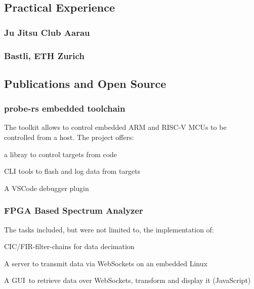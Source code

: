 \begin{timeline}
    \subsection{Practical Experience}
    
    \subsubsection{Ju Jitsu Club Aarau}
    \sectionsep

    \subsubsection{Bastli, ETH Zurich}
    \sectionsep
    
    
    \subsection{Publications and Open Source}

    \subsubsection{probe-rs embedded toolchain}
    The toolkit allows to control embedded ARM and RISC-V MCUs to be controlled from a host.
    The project offers:\\
    \begin{tightemize}
    \item a libray to control targets from code
    \item CLI tools to flash and log data from targets
    \item A VSCode debugger plugin
    \end{tightemize}
    \sectionsep
    
    \subsubsection{FPGA Based Spectrum Analyzer}
    The tasks included, but were not limited to, the implementation of:
    \begin{tightemize}
    \item CIC/FIR-filter-chains for data decimation
    \item A server to transmit data via WebSockets on an embedded Linux
    \item A GUI to retrieve data over WebSockets, transform and display it (JavaScript)
    \end{tightemize}
    \sectionsep
    

\end{timeline}
